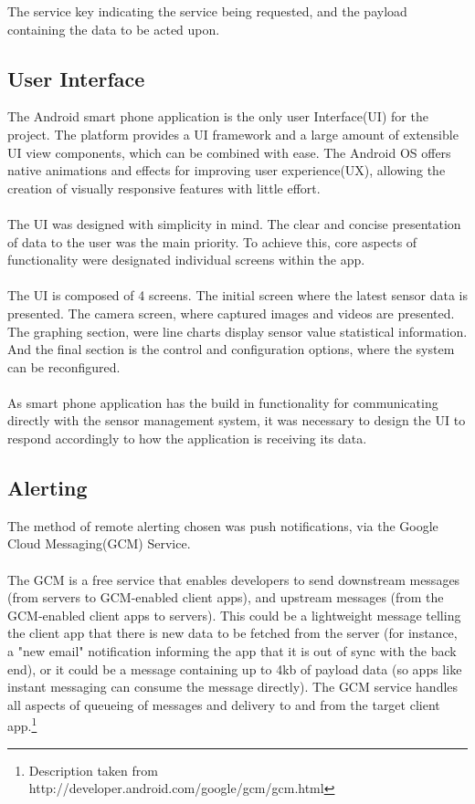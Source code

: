 \documentclass{article}
\begin{document}
The service key indicating the service being requested, and the payload containing the data to be acted upon.

\subsection{User Interface}
The Android smart phone application is the only user Interface(UI) for the project. The platform provides a UI framework and a large amount of extensible UI view components, which can be combined with ease. The Android OS offers native animations and effects for improving user experience(UX), allowing the creation of visually responsive features with little effort. \\\\ The UI was designed with simplicity in mind. The clear and concise presentation of data to the user was the main priority. To achieve this, core aspects of functionality were designated individual screens within the app. \\\\ The UI is composed of 4 screens. The initial screen where the latest sensor data is presented. The camera screen, where captured images and videos are presented. The graphing section, were line charts display sensor value statistical information. And the final section is the control and configuration options, where the system can be reconfigured. \\\\ As smart phone application has the build in functionality for communicating directly with the sensor management system, it was necessary to design the UI to respond accordingly to how the application is receiving its data.

\subsection{Alerting}
The method of remote alerting chosen was push notifications, via the Google Cloud Messaging(GCM) Service. \\\\ 
The GCM is a free service that enables developers to send downstream messages (from servers to GCM-enabled client apps), and upstream messages (from the GCM-enabled client apps to servers). This could be a lightweight message telling the client app that there is new data to be fetched from the server (for instance, a "new email" notification informing the app that it is out of sync with the back end), or it could be a message containing up to 4kb of payload data (so apps like instant messaging can consume the message directly). The GCM service handles all aspects of queueing of messages and delivery to and from the target client app.\footnote{Description taken from http://developer.android.com/google/gcm/gcm.html}
\end{document}
